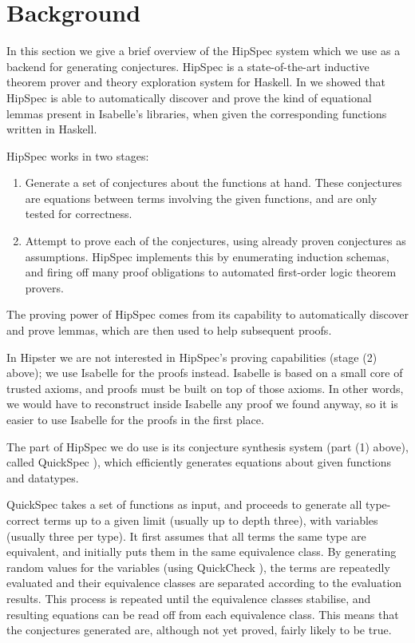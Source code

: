 \section{Background}
\label{sec:background}

In this section we give a brief overview of the HipSpec system which
we use as a backend for generating conjectures. HipSpec is a
state-of-the-art inductive theorem prover and theory exploration
system for Haskell. In \cite{hipspecCADE} we showed that HipSpec is
able to automatically discover and prove the kind of equational lemmas present in
Isabelle's libraries, when given the corresponding functions written in Haskell.

HipSpec works in two stages:
\begin{enumerate}
\item Generate a set of conjectures about the functions at hand. These conjectures are equations between terms involving the given functions, and are only tested for correctness.

\item Attempt to prove each of the conjectures, using already proven conjectures as assumptions. HipSpec implements this by enumerating induction schemas, and firing off many proof obligations to automated first-order logic theorem provers.
\end{enumerate}
The proving power of HipSpec comes from its capability to
automatically discover and prove lemmas, which are then used to help
subsequent proofs.

In Hipster we are not interested in HipSpec's
proving capabilities (stage (2) above); we use Isabelle for the proofs instead. Isabelle
is based on a small core of trusted axioms, and proofs must be built
on top of those axioms. In other words, we would have to reconstruct
inside Isabelle any proof we found anyway, so it is easier to use
Isabelle for the proofs in the first place.

The part of HipSpec we do use
is its conjecture synthesis system (part (1) above), called QuickSpec \cite{quickspec}),
which efficiently generates equations about given functions and
datatypes.

QuickSpec takes a set of functions as input, and proceeds to generate all
type-correct terms up to a given limit (usually up to depth three), with
variables (usually three per type).  It first assumes that all terms the same
type are equivalent, and initially puts them in the same equivalence class.  By
generating random values for the variables (using QuickCheck \cite{quickcheck}), the terms are repeatedly evaluated and their equivalence
classes are separated according to the evaluation results.  This process is
repeated until the equivalence classes stabilise, and resulting equations can
be read off from each equivalence class.  This means that the conjectures
generated are, although not yet proved, fairly likely to be true.

